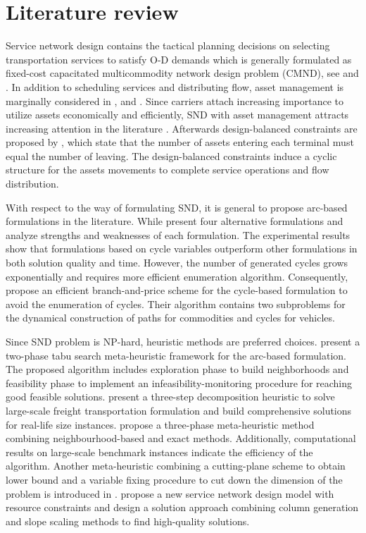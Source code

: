 \documentclass[11pt,nonblindrev,fleqn]{article}
\begin{document}
\section{Literature review}\label{review}
Service network design contains the tactical planning decisions on selecting transportation services to satisfy O-D demands which is generally formulated as fixed-cost capacitated multicommodity network design problem (CMND), see \cite{Magnanti1984Network} and \cite{Minoux1989Networks}. In addition to scheduling services and distributing flow, asset management is marginally considered in \cite{Crainic2000Service}, \cite{Smilowitz2002Deferred} and \cite{crainic2003long}. Since carriers attach increasing importance to utilize assets economically and efficiently, SND with asset management attracts increasing attention in the literature \citep{Andersen2009bService,Teypaz2010A}.   Afterwards design-balanced constraints are proposed by \cite{Pedersen2009Models}, which state that the number of assets entering each terminal must equal the number of leaving. The design-balanced constraints induce a cyclic structure for the assets movements to complete service operations and flow distribution.

With respect to the way of formulating SND, it is general to propose arc-based formulations in the literature. While \cite{Andersen2009bService} present four alternative formulations and analyze strengths and weaknesses of each formulation. The experimental results show that formulations based on cycle variables outperform other formulations in both solution quality and time. However, the number of generated cycles grows exponentially and requires more efficient enumeration algorithm. Consequently, \cite{Andersen2011Branch} propose an efficient branch-and-price scheme for the cycle-based formulation to avoid the enumeration of cycles. Their algorithm contains two subproblems for the dynamical construction of paths for commodities and cycles for vehicles.

Since SND problem is NP-hard, heuristic methods are preferred choices. \cite{Pedersen2009Models} present a two-phase tabu search meta-heuristic framework for the arc-based formulation. The proposed algorithm includes exploration phase to build neighborhoods and feasibility phase to implement an infeasibility-monitoring procedure for reaching good feasible solutions. \cite{Teypaz2010A} present a three-step decomposition heuristic to solve large-scale freight transportation formulation and build comprehensive solutions for real-life size instances. \cite{VuDucToulouse} propose a three-phase meta-heuristic method combining neighbourhood-based and exact methods. Additionally, computational results on large-scale benchmark instances indicate the efficiency of the algorithm. Another meta-heuristic combining a cutting-plane scheme to obtain lower bound and a variable fixing procedure to cut down the dimension of the problem is introduced in \cite{Chouman2015Cutting}. \cite{Crainic2016Service} propose a new service network design model with resource constraints and design a solution approach combining column generation and slope scaling methods to find high-quality solutions.
\end{document}
